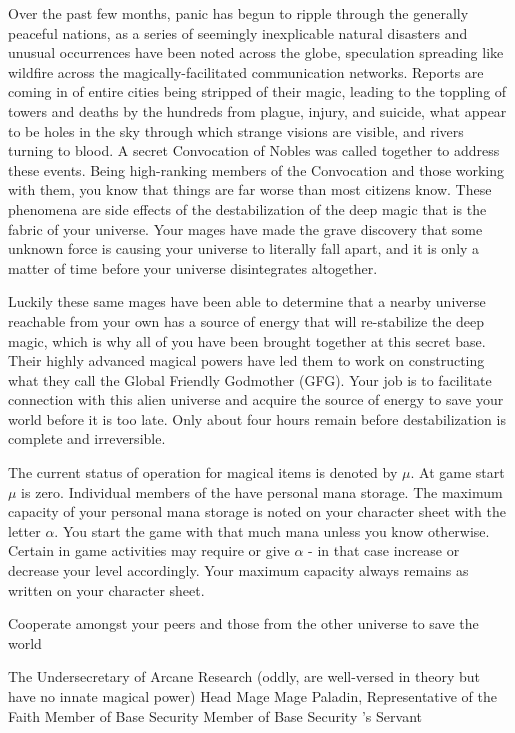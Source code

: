 \documentclass[blue]{guildcamp3}
\begin{document}
Over the past few months, panic has begun to ripple through the generally peaceful nations, as a series of seemingly inexplicable natural disasters and unusual occurrences have been noted across the globe, speculation spreading like wildfire across the magically-facilitated communication networks. Reports are coming in of entire cities being stripped of their magic, leading to the toppling of towers and deaths by the hundreds from plague, injury, and suicide, what appear to be holes in the sky through which strange visions are visible, and rivers turning to blood. A secret Convocation of Nobles was called together to address these events. Being high-ranking members of the Convocation and those working with them, you know that things are far worse than most citizens know. These phenomena are side effects of the destabilization of the deep magic that is the fabric of your universe. Your mages have made the grave discovery that some unknown force is causing your universe to literally fall apart, and it is only a matter of time before your universe disintegrates altogether.

Luckily these same mages have been able to determine that a nearby universe reachable from your own has a source of energy that will re-stabilize the deep magic, which is why all of you have been brought together at this secret base. Their highly advanced magical powers have led them to work on constructing what they call the Global Friendly Godmother (GFG). Your job is to facilitate connection with this alien universe and acquire the source of energy to save your world before it is too late. Only about four hours remain before destabilization is complete and irreversible.

The current status of operation for magical items is denoted by $\mu$. At game start $\mu$ is zero. Individual members of the \bMagicWorld{} have personal mana storage. The maximum capacity of your personal mana storage is noted on your character sheet with the letter $\alpha$. You start the game with that much mana unless you know otherwise. Certain in game activities may require or give $\alpha$ - in that case increase or decrease your level accordingly. Your maximum capacity always remains as written on your character sheet. 

\begin{itemz}[Goals]
	\item Cooperate amongst your peers and those from the other universe to save the world
\end{itemz}


\begin{members}
	\member{\cNobleOne{}} The Undersecretary of Arcane Research (oddly,  are well-versed in theory but have no innate magical power)
	\member{\cMageOne{}} Head Mage
	\member{\cMageTwo{}} Mage
	\member{\cPaladin{}} Paladin, Representative of the Faith
	\member{\cRogueOne{}} Member of Base Security
	\member{\cRogueTwo{}} Member of Base Security
	\member{\cServant{}} \cNobleOne{}'s Servant
\end{members}
\end{document}
